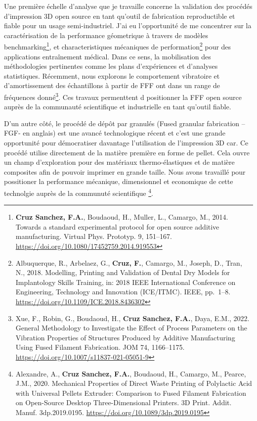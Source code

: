 \documentclass[
  12pt,
  oneside]{book}
\begin{document}
Une première échelle d'analyse que je travaille concerne la validation des procédés d'impression 3D open source en tant qu'outil de fabrication reproductible et fiable pour un usage semi-industriel.
J'ai eu l'opportunité de me concentrer sur la caractérisation de la performance géometrique à travers de modèles benchmarking\footnote{\textbf{Cruz Sanchez, F.A.}, Boudaoud, H., Muller, L., Camargo, M., 2014. Towards a standard experimental protocol for open source additive manufacturing. Virtual Phys. Prototyp. 9, 151--167. \url{https://doi.org/10.1080/17452759.2014.919553}}, et characteristiques mécaniques de performation\footnote{Albuquerque, R., Arbelaez, G., \textbf{Cruz, F.}, Camargo, M., Joseph, D., Tran, N., 2018. Modelling, Printing and Validation of Dental Dry Models for Implantology Skills Training, in: 2018 IEEE International Conference on Engineering, Technology and Innovation (ICE/ITMC). IEEE, pp.~1--8. \url{https://doi.org/10.1109/ICE.2018.8436302}} pour des applications entraînement médical.
Dans ce sens, la mobilisation des méthodologies pertinentes comme les plans d'expériences et d'analyses statistiques.
Récemment, nous explorons le comportement vibratoire et d'amortissement des échantillons à partir de FFF ont dans un range de fréquences donné\footnote{Xue, F., Robin, G., Boudaoud, H., \textbf{Cruz Sanchez, F.A.}, Daya, E.M., 2022. General Methodology to Investigate the Effect of Process Parameters on the Vibration Properties of Structures Produced by Additive Manufacturing Using Fused Filament Fabrication. JOM 74, 1166--1175. \url{https://doi.org/10.1007/s11837-021-05051-9}}.
Ces travaux permenttent d positionner la FFF open source auprès de la communauté scientifique et industrielle en tant qu'outil fiable.

D'un autre côté, le procédé de dépôt par granulés (Fused granular fabrication --FGF- en anglais) est une avancé technologique récent et c'est une grande opportunité pour démocratiser davantage l'utilisation de l'impression 3D car.
Ce procédé utilise directement de la matière première en forme de pellet.
Cela ouvre un champ d'exploration pour des matériaux thermo-élastiques et de matière composites afin de pouvoir imprimer en grande taille.
Nous avons travaillé pour possitioner la performance mécanique, dimensionnel et economique de cette technolgie auprès de la communuté scientifique \footnote{Alexandre, A., \textbf{Cruz Sanchez, F.A.}, Boudaoud, H., Camargo, M., Pearce, J.M., 2020. Mechanical Properties of Direct Waste Printing of Polylactic Acid with Universal Pellets Extruder: Comparison to Fused Filament Fabrication on Open-Source Desktop Three-Dimensional Printers. 3D Print. Addit. Manuf. 3dp.2019.0195. \url{https://doi.org/10.1089/3dp.2019.0195}}.
\end{document}
